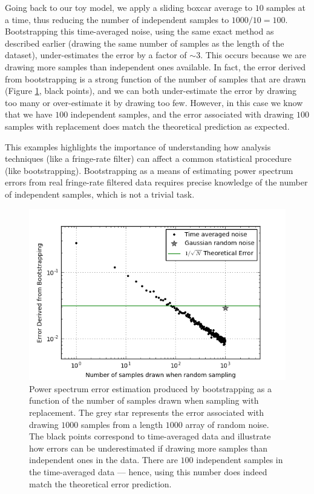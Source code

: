 \documentclass[preprint2,numberedappendix,tighten,twocolappendix]{aastex6}  %
\begin{document}
Going back to our toy model, we apply a sliding boxcar average to $10$ samples at a time, thus reducing the number of independent samples to $1000/10 = 100$. Bootstrapping this time-averaged noise, using the same exact method as described earlier (drawing the same number of samples as the length of the dataset), under-estimates the error by a factor of $\sim3$. This occurs because we are drawing more samples than independent ones available. In fact, the error derived from bootstrapping is a strong function of the number of samples that are drawn (Figure \ref{fig:toy_error1}, black points), and we can both under-estimate the error by drawing too many or over-estimate it by drawing too few. However, in this case we know that we have $100$ independent samples, and the error associated with drawing $100$ samples with replacement does match the theoretical prediction as expected.

This examples highlights the importance of understanding how analysis techniques (like a fringe-rate filter) can affect a common statistical procedure (like bootstrapping). Bootstrapping as a means of estimating power spectrum errors from real fringe-rate filtered data requires precise knowledge of the number of independent samples, which is not a trivial task.

\begin{figure}
	\centering
	\includegraphics[trim={0.3cm 0.3cm 0.3cm 0.3cm},width=\columnwidth]{plots/toy_error1.png}
	\caption{Power spectrum error estimation produced by bootstrapping as a function of the number of samples drawn when sampling with replacement. The grey star represents the error associated with drawing $1000$ samples from a length $1000$ array of random noise. The black points correspond to time-averaged data and illustrate how errors can be underestimated if drawing more samples than independent ones in the data. There are $100$ independent samples in the time-averaged data --- hence, using this number does indeed match the theoretical error prediction.}
	\label{fig:toy_error1}
\end{figure}
\end{document}
